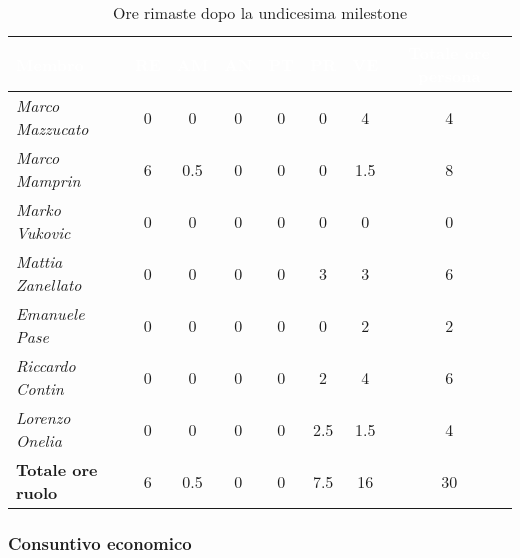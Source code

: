 \begin{table}[H]
    \renewcommand\arraystretch{1.5}
    \centering
    \begin{tabular}{|l|c|c|c|c|c|c|c|}
    \hline
    \rowcolor[HTML]{036400}
    \textcolor{white}{\textbf{Membro}} & \multicolumn{1}{c|}{\textcolor{white}{\textbf{RE}}} & \multicolumn{1}{c|}{\textcolor{white}{\textbf{AM}}} & \multicolumn{1}{c|}{\textcolor{white}{\textbf{AN}}} & \multicolumn{1}{c|}{\textcolor{white}{\textbf{PT}}} & \multicolumn{1}{c|}{\textcolor{white}{\textbf{PR}}} & \multicolumn{1}{c|}{\textcolor{white}{\textbf{VE}}} & \multicolumn{1}{c|}{\textcolor{white}{\textbf{Totale ore persona}}} \\ \hline
    \rowcolor[HTML]{EFEFEF}\textit{Marco Mazzucato}  & 0    & 0    & 0     & 0     & 0     & 4      & 4   \\ \hline
    \rowcolor[HTML]{C0C0C0}\textit{Marco Mamprin}    & 6    & 0.5  & 0     & 0     & 0     & 1.5    & 8   \\ \hline
    \rowcolor[HTML]{EFEFEF}\textit{Marko Vukovic}    & 0    & 0    & 0     & 0     & 0     & 0      & 0    \\ \hline
    \rowcolor[HTML]{C0C0C0}\textit{Mattia Zanellato} & 0    & 0    & 0     & 0     & 3     & 3      & 6   \\ \hline
    \rowcolor[HTML]{EFEFEF}\textit{Emanuele Pase}    & 0    & 0    & 0     & 0     & 0     & 2      & 2 \\ \hline
    \rowcolor[HTML]{C0C0C0}\textit{Riccardo Contin}  & 0    & 0    & 0     & 0     & 2     & 4      & 6   \\ \hline
    \rowcolor[HTML]{EFEFEF}\textit{Lorenzo Onelia}   & 0    & 0    & 0     & 0     & 2.5   & 1.5    & 4 \\ \hline
    \rowcolor[HTML]{C0C0C0}\textbf{Totale ore ruolo} & 6    & 0.5  & 0     & 0     & 7.5   & 16     & 30   \\ \hline
    \end{tabular}
    \caption{Ore rimaste dopo la undicesima milestone}
\end{table}

\subsubsection{Consuntivo economico}

